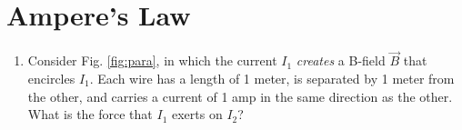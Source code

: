 \documentclass{article}
\begin{document}
\section{Ampere's Law}

\begin{enumerate}
\item Consider Fig. \ref{fig:para}, in which the current $I_1$ \textit{creates} a B-field $\vec{B}$ that encircles $I_1$.  Each wire has a length of 1 meter, is separated by 1 meter from the other, and carries a current of 1 amp in the same direction as the other.  What is the force that $I_1$ exerts on $I_2$?
\end{enumerate}
\end{document}
